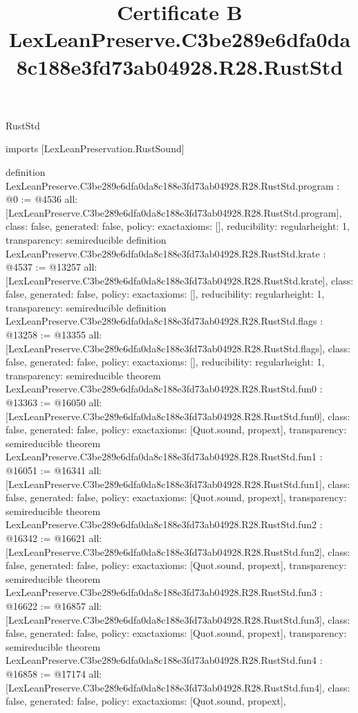 \begin{lexlean}{RustStd}
\title{Certificate B LexLeanPreserve.C3be289e6dfa0da8c188e3fd73ab04928.R28.RustStd}
\begin{coremodule}
imports [LexLeanPreservation.RustSound]

definition LexLeanPreserve.C3be289e6dfa0da8c188e3fd73ab04928.R28.RustStd.program : @0 := @4536 {
  all: [LexLeanPreserve.C3be289e6dfa0da8c188e3fd73ab04928.R28.RustStd.program],
  class: false,
  generated: false,
  policy: exact{axioms: []},
  reducibility: regular{height: 1},
  transparency: semireducible
}
definition LexLeanPreserve.C3be289e6dfa0da8c188e3fd73ab04928.R28.RustStd.krate : @4537 := @13257 {
  all: [LexLeanPreserve.C3be289e6dfa0da8c188e3fd73ab04928.R28.RustStd.krate],
  class: false,
  generated: false,
  policy: exact{axioms: []},
  reducibility: regular{height: 1},
  transparency: semireducible
}
definition LexLeanPreserve.C3be289e6dfa0da8c188e3fd73ab04928.R28.RustStd.flags : @13258 := @13355 {
  all: [LexLeanPreserve.C3be289e6dfa0da8c188e3fd73ab04928.R28.RustStd.flags],
  class: false,
  generated: false,
  policy: exact{axioms: []},
  reducibility: regular{height: 1},
  transparency: semireducible
}
theorem LexLeanPreserve.C3be289e6dfa0da8c188e3fd73ab04928.R28.RustStd.fun0 : @13363 := @16050 {
  all: [LexLeanPreserve.C3be289e6dfa0da8c188e3fd73ab04928.R28.RustStd.fun0],
  class: false,
  generated: false,
  policy: exact{axioms: [Quot.sound, propext]},
  transparency: semireducible
}
theorem LexLeanPreserve.C3be289e6dfa0da8c188e3fd73ab04928.R28.RustStd.fun1 : @16051 := @16341 {
  all: [LexLeanPreserve.C3be289e6dfa0da8c188e3fd73ab04928.R28.RustStd.fun1],
  class: false,
  generated: false,
  policy: exact{axioms: [Quot.sound, propext]},
  transparency: semireducible
}
theorem LexLeanPreserve.C3be289e6dfa0da8c188e3fd73ab04928.R28.RustStd.fun2 : @16342 := @16621 {
  all: [LexLeanPreserve.C3be289e6dfa0da8c188e3fd73ab04928.R28.RustStd.fun2],
  class: false,
  generated: false,
  policy: exact{axioms: [Quot.sound, propext]},
  transparency: semireducible
}
theorem LexLeanPreserve.C3be289e6dfa0da8c188e3fd73ab04928.R28.RustStd.fun3 : @16622 := @16857 {
  all: [LexLeanPreserve.C3be289e6dfa0da8c188e3fd73ab04928.R28.RustStd.fun3],
  class: false,
  generated: false,
  policy: exact{axioms: [Quot.sound, propext]},
  transparency: semireducible
}
theorem LexLeanPreserve.C3be289e6dfa0da8c188e3fd73ab04928.R28.RustStd.fun4 : @16858 := @17174 {
  all: [LexLeanPreserve.C3be289e6dfa0da8c188e3fd73ab04928.R28.RustStd.fun4],
  class: false,
  generated: false,
  policy: exact{axioms: [Quot.sound, propext]},
}
\end{coremodule}
\end{lexlean}
